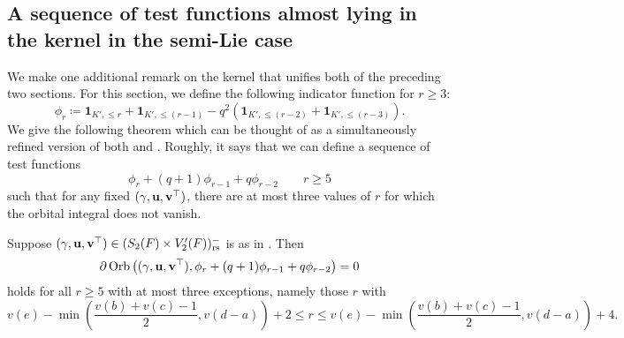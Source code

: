 \subsection{A sequence of test functions almost lying in the kernel in the semi-Lie case}
We make one additional remark on the kernel that unifies both of the preceding two sections.
For this section, we define the following indicator function for $r \ge 3$:
\[ \phi_r \coloneqq \mathbf{1}_{K', \le r} + \mathbf{1}_{K', \le (r-1)}
   - q^2 (\mathbf{1}_{K', \le (r-2)} + \mathbf{1}_{K', \le (r-3)}). \]
We give the following theorem which can be thought of as a simultaneously
refined version of both  and
.
Roughly, it says that we can define a sequence of test functions
\[ \phi_r + (q+1)\phi_{r-1} + q\phi_{r-2} \qquad r \ge 5 \]
such that for any fixed ${(\gamma, \mathbf u, \mathbf v^\top)}$, there are at most three values of $r$
for which the orbital integral does not vanish.
\begin{theorem}
  [A sequence in $\HH(S_2(F))$]
  \label{thm:semi_lie_finite_codim_full}
  Suppose ${(\gamma, \mathbf u, \mathbf v^\top)} \in (S_2(F) \times V_2'(F))_{\mathrm{rs}}^-$ is as in .
  Then
  \[ \partial \operatorname{Orb} \left( {(\gamma, \mathbf u, \mathbf v^\top)}, \phi_r + (q+1)\phi_{r-1} + q\phi_{r-2} \right) = 0 \]
  holds for all $r \ge 5$ with at most three exceptions,
  namely those $r$ with
  \[ v(e) - \min\left(\frac{v(b)+v(c)-1}{2}, v(d-a)\right) + 2
    \le r \le v(e) - \min\left(\frac{v(b)+v(c)-1}{2}, v(d-a)\right) + 4. \]
\end{theorem}
